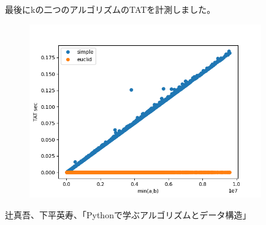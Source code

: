 \documentclass[dvipdfmx]{jarticle}
\begin{document}
 最後にkの二つのアルゴリズムのTATを計測しました。
 \begin{figure}[h]
 \begin{center}
\includegraphics[width=100mm]{time_measure.png}
\end{center}
\end{figure}

\begin{thebibliography}{9}
\item 辻真吾、下平英寿、「Pythonで学ぶアルゴリズムとデータ構造」
\end{thebibliography}
\end{document}
